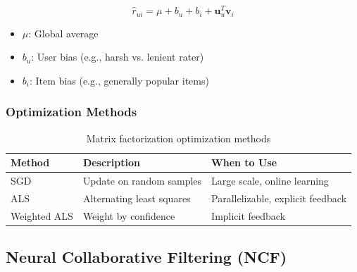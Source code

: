 \begin{equation}
\hat{r}_{ui} = \mu + b_u + b_i + \mathbf{u}_u^T \mathbf{v}_i
\end{equation}

\begin{itemize}
    \item $\mu$: Global average
    \item $b_u$: User bias (e.g., harsh vs. lenient rater)
    \item $b_i$: Item bias (e.g., generally popular items)
\end{itemize}

\subsubsection{Optimization Methods}

\begin{table}[H]
\centering
\caption{Matrix factorization optimization methods}
\begin{tabularx}{\textwidth}{lXX}
\toprule
\textbf{Method} & \textbf{Description} & \textbf{When to Use} \\
\midrule
SGD & Update on random samples & Large scale, online learning \\
ALS & Alternating least squares & Parallelizable, explicit feedback \\
Weighted ALS & Weight by confidence & Implicit feedback \\
\bottomrule
\end{tabularx}
\end{table}

\subsection{Neural Collaborative Filtering (NCF)}

